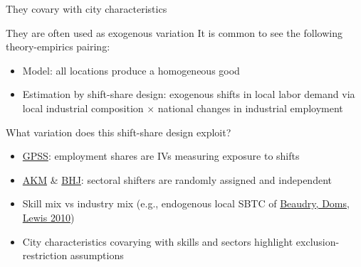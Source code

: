 \documentclass[11pt,notes=hide,aspectratio=169]{beamer}
\begin{document}
\begin{frame}{They covary with city characteristics}
	\begin{center}
	\end{center}
\end{frame}
\begin{frame}{They are often used as exogenous variation}
It is common to see the following theory-empirics pairing:
\begin{itemize}
	\item Model: all locations produce a homogeneous good
	\item Estimation by shift-share design: exogenous shifts in local labor demand via local industrial composition $\times$ national changes in industrial employment
\end{itemize}
What variation does this shift-share design exploit?
\begin{itemize}
	\item \href{https://paulgp.github.io/papers/bartik_gpss.pdf}{GPSS}: employment shares are IVs measuring exposure to shifts
	\item \href{https://doi.org/10.1093/qje/qjz025}{AKM} \& \href{https://doi.org/10.1093/restud/rdab030}{BHJ}: sectoral shifters are randomly assigned and independent
	\item Skill mix vs industry mix (e.g., endogenous local SBTC of \href{http://www.jstor.org/stable/10.1086/658371}{Beaudry, Doms, Lewis 2010})
	\item City characteristics covarying with skills and sectors highlight exclusion-restriction assumptions 
\end{itemize}
\end{frame}
\end{document}
